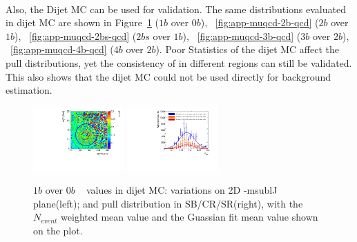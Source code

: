 \paragraph{}
Also, the Dijet MC can be used for validation. 
The same distributions evaluated in dijet MC are shown in Figure~\ref{fig:app-muqcd-1b-qcd} ($1b$ over $0b$), ~\ref{fig:app-muqcd-2b-qcd} ($2b$ over $1b$), ~\ref{fig:app-muqcd-2bs-qcd} ($2bs$ over $1b$), ~\ref{fig:app-muqcd-3b-qcd} ($3b$ over $2b$), ~\ref{fig:app-muqcd-4b-qcd} ($4b$ over $2b$).  
Poor Statistics of the dijet MC affect the pull distributions, yet the consistency of \muqcd in different regions can still be validated.
This also shows that the dijet MC could not be used directly for background estimation.


\begin{figure}[htbp!]
\begin{center}
\includegraphics[width=0.31\textwidth,angle=-90]{figures/boosted/AppendixMuqcdstudy/QCD_OneTag_Incl_mH0H1.pdf}
\includegraphics[width=0.31\textwidth,angle=-90]{figures/boosted/AppendixMuqcdstudy/QCD_OneTag_Incl_mH0H1_pull.pdf}
\caption{$1b$ over 0$b$ \muqcd~ values in dijet MC: \muqcd variations on 2D \mleadJ-msublJ plane(left); and \muqcd pull distribution in SB/CR/SR(right), with the $N_{event}$ weighted mean value and the Guassian fit mean value shown on the plot.}
\label{fig:app-muqcd-1b-qcd}
\end{center}
\end{figure}

